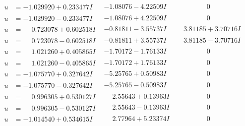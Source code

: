 \documentclass[1p]{elsarticle_modified}
\theoremstyle{definition}
\begin{document}
$$\begin{array}{c|c|c}
\begin{aligned}
u &= -1.029920 + 0.233477 I\end{aligned}
 & -1.08076 - 4.22509 I & \phantom{-0.000000 } 0 \\ \hline\begin{aligned}
u &= -1.029920 - 0.233477 I\end{aligned}
 & -1.08076 + 4.22509 I & \phantom{-0.000000 } 0 \\ \hline\begin{aligned}
u &= \phantom{-}0.723078 + 0.602518 I\end{aligned}
 & -0.81811 - 3.55737 I & \phantom{-}3.81185 + 3.70716 I \\ \hline\begin{aligned}
u &= \phantom{-}0.723078 - 0.602518 I\end{aligned}
 & -0.81811 + 3.55737 I & \phantom{-}3.81185 - 3.70716 I \\ \hline\begin{aligned}
u &= \phantom{-}1.021260 + 0.405865 I\end{aligned}
 & -1.70172 - 1.76133 I & \phantom{-0.000000 } 0 \\ \hline\begin{aligned}
u &= \phantom{-}1.021260 - 0.405865 I\end{aligned}
 & -1.70172 + 1.76133 I & \phantom{-0.000000 } 0 \\ \hline\begin{aligned}
u &= -1.075770 + 0.327642 I\end{aligned}
 & -5.25765 + 0.50983 I & \phantom{-0.000000 } 0 \\ \hline\begin{aligned}
u &= -1.075770 - 0.327642 I\end{aligned}
 & -5.25765 - 0.50983 I & \phantom{-0.000000 } 0 \\ \hline\begin{aligned}
u &= \phantom{-}0.996305 + 0.530127 I\end{aligned}
 & \phantom{-}2.55643 + 0.13963 I & \phantom{-0.000000 } 0 \\ \hline\begin{aligned}
u &= \phantom{-}0.996305 - 0.530127 I\end{aligned}
 & \phantom{-}2.55643 - 0.13963 I & \phantom{-0.000000 } 0 \\ \hline\begin{aligned}
u &= -1.014540 + 0.534615 I\end{aligned}
 & \phantom{-}2.77964 + 5.23374 I & \phantom{-0.000000 } 0 \\ \hline\begin{aligned}

\end{aligned}
\end{array}$$
\end{document}
